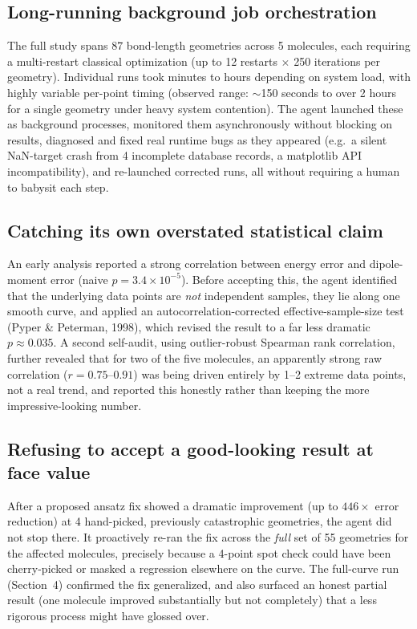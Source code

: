 \documentclass[11pt]{article}
\begin{document}
\subsection{Long-running background job orchestration}
The full study spans 87 bond-length geometries across 5 molecules, each requiring a multi-restart classical optimization (up to 12 restarts $\times$ 250 iterations per geometry). Individual runs took minutes to hours depending on system load, with highly variable per-point timing (observed range: $\sim$150 seconds to over 2 hours for a single geometry under heavy system contention). The agent launched these as background processes, monitored them asynchronously without blocking on results, diagnosed and fixed real runtime bugs as they appeared (e.g.\ a silent NaN-target crash from 4 incomplete database records, a matplotlib API incompatibility), and re-launched corrected runs, all without requiring a human to babysit each step.

\subsection{Catching its own overstated statistical claim}
An early analysis reported a strong correlation between energy error and dipole-moment error (naive $p = 3.4\times10^{-5}$). Before accepting this, the agent identified that the underlying data points are \emph{not} independent samples, they lie along one smooth curve, and applied an autocorrelation-corrected effective-sample-size test (Pyper \& Peterman, 1998), which revised the result to a far less dramatic $p \approx 0.035$. A second self-audit, using outlier-robust Spearman rank correlation, further revealed that for two of the five molecules, an apparently strong raw correlation ($r = 0.75$--$0.91$) was being driven entirely by 1--2 extreme data points, not a real trend, and reported this honestly rather than keeping the more impressive-looking number.

\subsection{Refusing to accept a good-looking result at face value}
After a proposed ansatz fix showed a dramatic improvement (up to $446\times$ error reduction) at 4 hand-picked, previously catastrophic geometries, the agent did not stop there. It proactively re-ran the fix across the \emph{full} set of 55 geometries for the affected molecules, precisely because a 4-point spot check could have been cherry-picked or masked a regression elsewhere on the curve. The full-curve run (Section~4) confirmed the fix generalized, and also surfaced an honest partial result (one molecule improved substantially but not completely) that a less rigorous process might have glossed over.
\end{document}
